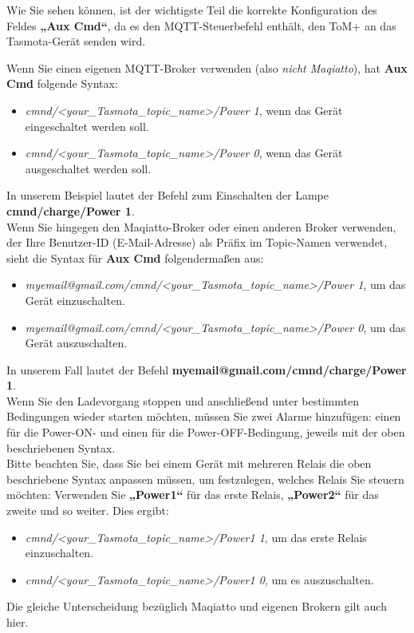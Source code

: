 Wie Sie sehen können, ist der wichtigste Teil die korrekte Konfiguration des Feldes
\textbf{„Aux Cmd“}, da es den MQTT-Steuerbefehl enthält, den ToM+ an das
Tasmota-Gerät senden wird.

Wenn Sie einen eigenen MQTT-Broker verwenden (also \textit{nicht Maqiatto}), hat
\textbf{Aux Cmd} folgende Syntax:
\begin{itemize}
    \item \textit{cmnd/<your\_Tasmota\_topic\_name>/Power 1}, wenn das Gerät eingeschaltet werden soll.
    \item \textit{cmnd/<your\_Tasmota\_topic\_name>/Power 0}, wenn das Gerät ausgeschaltet werden soll.
\end{itemize}
In unserem Beispiel lautet der Befehl zum Einschalten der Lampe \textbf{cmnd/charge/Power 1}.\\

Wenn Sie hingegen den Maqiatto-Broker oder einen anderen Broker verwenden, der Ihre Benutzer-ID (E-Mail-Adresse)
als Präfix im Topic-Namen verwendet, sieht die Syntax für \textbf{Aux Cmd} folgendermaßen aus:
\begin{itemize}
    \item \textit{myemail@gmail.com/cmnd/<your\_Tasmota\_topic\_name>/Power 1}, um das Gerät einzuschalten.
    \item \textit{myemail@gmail.com/cmnd/<your\_Tasmota\_topic\_name>/Power 0}, um das Gerät auszuschalten.
\end{itemize}
In unserem Fall lautet der Befehl \textbf{myemail@gmail.com/cmnd/charge/Power 1}.\\

Wenn Sie den Ladevorgang stoppen und anschließend unter bestimmten Bedingungen wieder starten möchten,
müssen Sie zwei Alarme hinzufügen: einen für die Power-ON- und einen für die Power-OFF-Bedingung,
jeweils mit der oben beschriebenen Syntax.\\

Bitte beachten Sie, dass Sie bei einem Gerät mit mehreren Relais die oben beschriebene Syntax
anpassen müssen, um festzulegen, welches Relais Sie steuern möchten:
Verwenden Sie \textbf{„Power1“} für das erste Relais, \textbf{„Power2“} für das zweite und so weiter.
Dies ergibt:
\begin{itemize} 
    \item \textit{cmnd/<your\_Tasmota\_topic\_name>/Power1 1}, um das erste Relais einzuschalten.
    \item \textit{cmnd/<your\_Tasmota\_topic\_name>/Power1 0}, um es auszuschalten.
\end{itemize}
Die gleiche Unterscheidung bezüglich Maqiatto und eigenen Brokern gilt auch hier.



